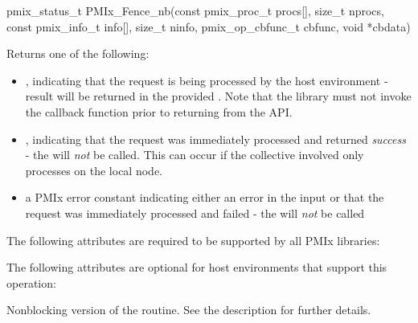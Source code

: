 \cspecificstart
\begin{codepar}
pmix_status_t
PMIx_Fence_nb(const pmix_proc_t procs[], size_t nprocs,
              const pmix_info_t info[], size_t ninfo,
              pmix_op_cbfunc_t cbfunc, void *cbdata)
\end{codepar}
\cspecificend

\begin{arglist}
\end{arglist}

Returns one of the following:

\begin{itemize}
    \item {}, indicating that the request is being processed by the host environment - result will be returned in the provided . Note that the library must not invoke the callback function prior to returning from the \ac{API}.
    \item {}, indicating that the request was immediately processed and returned \textit{success} - the  will \textit{not} be called. This can occur if the collective involved only processes on the local node.
    \item a \ac{PMIx} error constant indicating either an error in the input or that the request was immediately processed and failed - the  will \textit{not} be called
\end{itemize}


\reqattrstart
The following attributes are required to be supported by all \ac{PMIx} libraries:


\reqattrend

\optattrstart
The following attributes are optional for host environments that support this operation:


\optattrend

\descr

Nonblocking version of the  routine. See the  description for further details.


